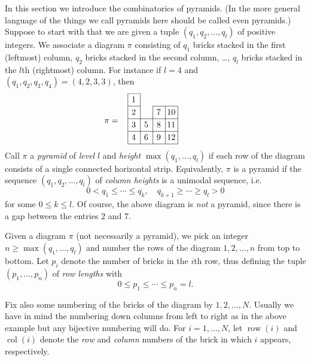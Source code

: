 \documentclass[twoside,12pt,reqno]{amsart}
\def\row{\operatorname{row}}
\def\col{\operatorname{col}}
\begin{document}
In this section we introduce the combinatorics of pyramids.
(In the more general language of \cite[$\S$4]{EK} 
the things we call pyramids here should be called
even pyramids.)
Suppose to start with that we are given a tuple
$(q_1,q_2,\dots,q_l)$ of positive integers.
We associate a diagram $\pi$ consisting of $q_1$ bricks
stacked in the first (leftmost) column,
$q_2$ bricks stacked in the second column, \dots,
$q_l$ bricks stacked in the $l$th (rightmost) column.
For instance if $l=4$ and
$(q_1,q_2,q_3,q_4) = (4,2,3,3)$, then
$$
\begin{picture}(65, 60)%
\put(0,0){\line(1,0){60}}
\put(0,15){\line(1,0){60}}
\put(0,30){\line(1,0){60}}
\put(0,45){\line(1,0){15}}
\put(0,60){\line(1,0){15}}
\put(30,45){\line(1,0){30}}
\put(0,0){\line(0,1){60}}
\put(15,0){\line(0,1){60}}
\put(30,0){\line(0,1){45}}
\put(45,0){\line(0,1){45}}
\put(60,0){\line(0,1){45}}
\put(7,8){\makebox(0,0){4}}
\put(7,23){\makebox(0,0){3}}
\put(7,38){\makebox(0,0){2}}
\put(7,53){\makebox(0,0){1}}
\put(22,8){\makebox(0,0){6}}
\put(22,23){\makebox(0,0){5}}
\put(37,8){\makebox(0,0){9}}
\put(37,23){\makebox(0,0){8}}
\put(37,38){\makebox(0,0){7}}
\put(52,8){\makebox(0,0){12}}
\put(52,23){\makebox(0,0){11}}
\put(52,38){\makebox(0,0){10}}
\put(-20,27){\makebox(0,0){$\pi =$}}
\end{picture}
$$
Call $\pi$ a {\em pyramid} of {\em level} $l$ 
and {\em height} $\max(q_1,\dots,q_l)$ if each row of the
diagram consists of a single connected horizontal strip.
Equivalently, $\pi$ is a pyramid if the sequence
$(q_1,q_2,\dots,q_l)$ of {\em column heights} is a
unimodal sequence, i.e.
\begin{equation}\label{pyr1}
0 < q_1 \leq \cdots \leq q_k,
\quad
q_{k+1} \geq \cdots \geq q_l > 0
\end{equation} 
for some $0 \leq k \leq l$.
Of course, the above diagram is {\em not} a pyramid, since there
is a gap between the entries $2$ and $7$.

Given a diagram $\pi$ (not necessarily a pyramid), we pick an integer
$n \geq \max(q_1,\dots,q_l)$ and number
the rows of the diagram $1,2,\dots,n$ 
from top to bottom.
Let $p_i$ denote the number of bricks in the $i$th row,
thus defining the tuple $(p_1,\dots,p_n)$ of {\em row lengths} with
\begin{equation}
0 \leq p_1\leq \cdots \leq p_n = l.
\end{equation}
\iffalse
Usually we have in mind that $n$ should
exactly equal $\max(q_1,\dots,q_l)$,
so that {\em either $n=0$ or $p_1 > 0$}, but it is sometimes useful to allow $n$ to be larger.
\fi
Fix also some numbering of the bricks of the diagram by
$1,2,\dots,N$. Usually we have in mind the numbering down columns from
left to right as in the above example but any 
bijective numbering will do.
For $i=1,\dots,N$, let $\row(i)$ and $\col(i)$
denote the {\em row} and {\em column} numbers
of the brick in which $i$ appears, respectively.
\end{document}
